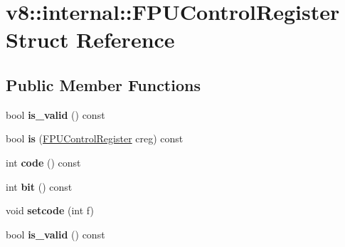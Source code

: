 \hypertarget{structv8_1_1internal_1_1_f_p_u_control_register}{}\section{v8\+:\+:internal\+:\+:F\+P\+U\+Control\+Register Struct Reference}
\label{structv8_1_1internal_1_1_f_p_u_control_register}
\subsection*{Public Member Functions}
\begin{DoxyCompactItemize}
\item 
bool {\bfseries is\+\_\+valid} () const \hypertarget{structv8_1_1internal_1_1_f_p_u_control_register_a1ad8d57d387f71e24af5750ece909b34}{}\label{structv8_1_1internal_1_1_f_p_u_control_register_a1ad8d57d387f71e24af5750ece909b34}

\item 
bool {\bfseries is} (\hyperlink{structv8_1_1internal_1_1_f_p_u_control_register}{F\+P\+U\+Control\+Register} creg) const \hypertarget{structv8_1_1internal_1_1_f_p_u_control_register_ac12c8d836cbbd28cf417a283274ff492}{}\label{structv8_1_1internal_1_1_f_p_u_control_register_ac12c8d836cbbd28cf417a283274ff492}

\item 
int {\bfseries code} () const \hypertarget{structv8_1_1internal_1_1_f_p_u_control_register_a46550cd8bfdb91fd17b7cba2d01f8ddf}{}\label{structv8_1_1internal_1_1_f_p_u_control_register_a46550cd8bfdb91fd17b7cba2d01f8ddf}

\item 
int {\bfseries bit} () const \hypertarget{structv8_1_1internal_1_1_f_p_u_control_register_acb95921927dfbe2706be0c686dc883be}{}\label{structv8_1_1internal_1_1_f_p_u_control_register_acb95921927dfbe2706be0c686dc883be}

\item 
void {\bfseries setcode} (int f)\hypertarget{structv8_1_1internal_1_1_f_p_u_control_register_a6f06c7ced9e245e228cc87cd9549984a}{}\label{structv8_1_1internal_1_1_f_p_u_control_register_a6f06c7ced9e245e228cc87cd9549984a}

\item 
bool {\bfseries is\+\_\+valid} () const \hypertarget{structv8_1_1internal_1_1_f_p_u_control_register_a1ad8d57d387f71e24af5750ece909b34}{}\label{structv8_1_1internal_1_1_f_p_u_control_register_a1ad8d57d387f71e24af5750ece909b34}


\end{DoxyCompactItemize}

